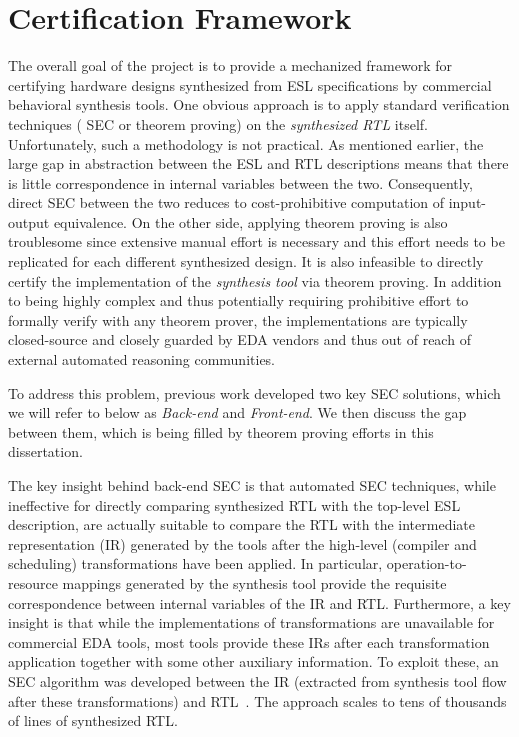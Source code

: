 \section{Certification Framework}

The overall goal of the project is to provide a mechanized framework
for certifying hardware designs synthesized from ESL specifications by
commercial behavioral synthesis tools.
One obvious approach is to apply standard verification techniques (%
SEC or
theorem proving) on the {\em synthesized RTL} itself.
Unfortunately, such a methodology is not practical.
As mentioned earlier, the large gap in abstraction
between the ESL and RTL descriptions means that there is little
correspondence in internal variables between the two.  Consequently,
direct SEC between the two reduces to cost-prohibitive computation of
input-output equivalence. On the other side, applying theorem proving
is also troublesome since extensive manual effort is necessary and
this effort needs to be replicated for each different synthesized
design. It is also infeasible to
directly certify the implementation of the {\em synthesis tool} via
theorem proving.  In addition to being highly complex and thus
potentially requiring prohibitive effort to formally verify with any
theorem prover, the implementations are typically closed-source and
closely guarded by EDA vendors and thus out of reach of external
automated reasoning communities.

To address this problem, previous work developed two key SEC
solutions, which we will refer to below as {\em Back-end} and {\em
  Front-end}.  We then discuss the gap between them, which is being
filled by theorem proving efforts in this dissertation.

\medskip

 The key insight behind
back-end SEC is that automated SEC techniques, while
ineffective for directly comparing synthesized RTL with the
top-level ESL description, are actually suitable to compare
the RTL with the intermediate representation (IR) generated
by the tools after the high-level (compiler and scheduling)
transformations have been applied.  In particular,
operation-to-resource mappings generated by the synthesis
tool provide the requisite correspondence between internal
variables of the IR and RTL.  Furthermore, a key insight is
that while the implementations of transformations are
unavailable for commercial EDA tools, most tools provide
these IRs after each transformation application together
with some other auxiliary information.  To exploit these, an
SEC algorithm was developed between the IR (extracted from
synthesis tool flow after these transformations) and
RTL~\cite{rhcxy:atva-09,hxry:date-10}.  The approach scales
to tens of thousands of lines of synthesized RTL.

